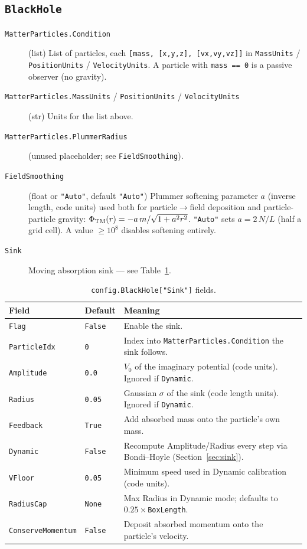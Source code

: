 \documentclass[11pt]{article}
\newcommand{\code}[1]{\texttt{#1}}
\newcommand{\field}[1]{\texttt{#1}}
\begin{document}
\subsection{\field{BlackHole}}
\begin{description}
  \item[\field{MatterParticles.Condition}] (list) List of particles, each
    \code{[mass, [x,y,z], [vx,vy,vz]]} in \field{MassUnits} /
    \field{PositionUnits} / \field{VelocityUnits}. A particle with
    \code{mass == 0} is a passive observer (no gravity).
  \item[\field{MatterParticles.MassUnits} / \field{PositionUnits} /
    \field{VelocityUnits}] (str) Units for the list above.
  \item[\field{MatterParticles.PlummerRadius}] (unused placeholder; see
    \field{FieldSmoothing}).
  \item[\field{FieldSmoothing}] (float or \code{"Auto"}, default
    \code{"Auto"}) Plummer softening parameter $a$ (inverse length, code
    units) used both for particle$\to$field deposition and particle-particle
    gravity: $\Phi_{\rm TM}(r) = -a\,m/\sqrt{1+a^2r^2}$. \code{"Auto"} sets
    $a = 2\,N/L$ (half a grid cell). A value $\geq 10^8$ disables softening
    entirely.
  \item[\field{Sink}] Moving absorption sink --- see Table~\ref{tab:sink}.
\end{description}

\begin{table}[h]
\centering
\begin{tabular}{@{}lll@{}}
\toprule
Field & Default & Meaning \\
\midrule
\field{Flag} & \code{False} & Enable the sink. \\
\field{ParticleIdx} & \code{0} & Index into \field{MatterParticles.Condition} the sink follows. \\
\field{Amplitude} & \code{0.0} & $V_0$ of the imaginary potential (code units). Ignored if \field{Dynamic}. \\
\field{Radius} & \code{0.05} & Gaussian $\sigma$ of the sink (code length units). Ignored if \field{Dynamic}. \\
\field{Feedback} & \code{True} & Add absorbed mass onto the particle's own mass. \\
\field{Dynamic} & \code{False} & Recompute Amplitude/Radius every step via Bondi--Hoyle (Section~\ref{sec:sink}). \\
\field{VFloor} & \code{0.05} & Minimum speed used in Dynamic calibration (code units). \\
\field{RadiusCap} & \code{None} & Max Radius in Dynamic mode; defaults to $0.25\times$\field{BoxLength}. \\
\field{ConserveMomentum} & \code{False} & Deposit absorbed momentum onto the particle's velocity. \\
\bottomrule
\end{tabular}
\caption{\code{config.BlackHole["Sink"]} fields.}
\label{tab:sink}
\end{table}
\end{document}
